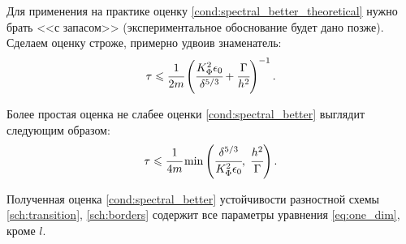 Для применения на практике оценку \eqref{cond:spectral_better_theoretical} нужно брать <<с запасом>> (экспериментальное обоснование будет дано позже). Сделаем оценку строже, примерно удвоив знаменатель:
\begin{equation}
	\tau \leqslant \cfrac{1}{2m} \left( \cfrac{K_\Phi^2 \epsilon_0}{\delta^{5 / 3}} + \cfrac{\Gamma}{h^2} \right)^{-1} {\text{.}}
	\label{cond:spectral_better}
\end{equation}

Более простая оценка не слабее оценки \eqref{cond:spectral_better} выглядит следующим образом:
$$\tau \leqslant \cfrac{1}{4m} \min \left(\cfrac{\delta^{5 / 3}}{K_\Phi^2 \epsilon_0}, \; \cfrac{h^2}{\Gamma} \right) {\text{.}}$$

Полученная оценка \eqref{cond:spectral_better} устойчивости разностной схемы \eqref{sch:transition}, \eqref{sch:borders} содержит все параметры уравнения \eqref{eq:one_dim}, кроме $l$.